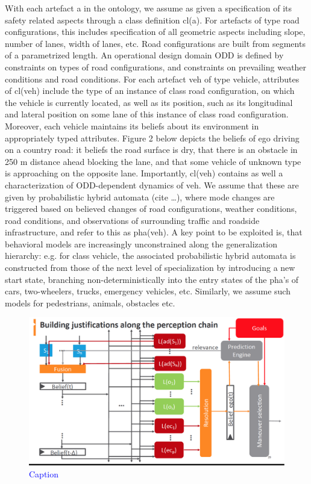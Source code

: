 With each artefact  a  in the ontology, we assume as given a specification of its safety related aspects through a class definition cl(a). For artefacts of type road configurations, this includes specification of all geometric aspects including slope, number of lanes, width of lanes, etc. Road configurations are built from segments of a parametrized length. An operational design domain ODD is defined by constraints on types of road configurations, and constraints on prevailing weather conditions and road conditions. For each artefact veh of type vehicle, attributes of cl(veh) include the type of an instance of class road configuration, on which the vehicle is currently located, as well as its position, such as its longitudinal and lateral position on some lane of this instance of class road configuration. Moreover, each vehicle maintains its beliefs about its environment in appropriately typed attributes. Figure 2 below depicts the beliefs of ego driving on a country road: it beliefs the road surface is dry, that there is an obstacle in 250 m distance ahead blocking the lane, and that some vehicle of unknown type is approaching on the opposite lane. Importantly, cl(veh) contains as well a characterization of ODD-dependent dynamics of veh. We assume that these are given by probabilistic hybrid automata (cite \ldots), where mode changes are triggered based on believed changes of road configurations, weather conditions, road conditions, and observations of surrounding traffic and roadside infrastructure, and refer to this as pha(veh). A key point to be exploited is, that behavioral models are increasingly unconstrained along the generalization hierarchy: e.g. for class vehicle, the associated probabilistic hybrid automata is constructed from those of the next level of specialization by introducing a new start state, branching non-deterministically into the entry states of the pha's of cars, two-wheelers, trucks, emergency vehicles, etc. Similarly, we assume such models for pedestrians, animals, obstacles etc.

\begin{figure}
    \centering
    \includegraphics[width=\textwidth]{fig2.eps}
    \caption{\textcolor{blue}{Caption}}
    \label{fig2}
\end{figure}

